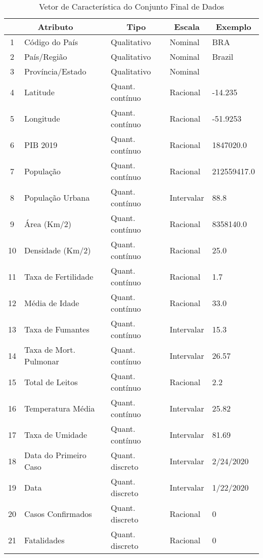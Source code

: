 \documentclass{ieeeaccess}
\begin{document}
\begin{table}[t!]
	\caption{Vetor de Característica do Conjunto Final de Dados}
	\label{tab1}
	\setlength{\tabcolsep}{3pt}
	\setlength\extrarowheight{2.5pt}
	
	\centering	
	\begin{tabular}{| c | l | l | l | l |}
		\hline
		\multicolumn{2}{|c|}{Atributo} & \multicolumn{1}{c|}{Tipo} & \multicolumn{1}{c|}{Escala} & \multicolumn{1}{c|}{Exemplo} \\ \hline
		
		1  & Código do País & Qualitativo & Nominal & BRA \\
		2 & País/Região & Qualitativo & Nominal & Brazil \\
		3 & Província/Estado & Qualitativo & Nominal & \\
		4 & Latitude & Quant. contínuo & Racional & -14.235 \\
		5 & Longitude & Quant. contínuo & Racional & -51.9253 \\
		6 & PIB 2019 & Quant. contínuo & Racional & 1847020.0 \\
		7 & População & Quant. contínuo & Racional & 212559417.0 \\
		8 & População Urbana & Quant. contínuo & Intervalar & 88.8 \\
		9 & Área (Km/2) & Quant. contínuo & Racional & 8358140.0 \\
		10 & Densidade (Km/2) & Quant. contínuo & Racional & 25.0  \\
		11 & Taxa de Fertilidade & Quant. contínuo & Racional & 1.7 \\
		12 & Média de Idade & Quant. contínuo & Racional & 33.0  \\
		13 & Taxa de Fumantes & Quant. contínuo & Intervalar & 15.3 \\
		14 & Taxa de Mort. Pulmonar & Quant. contínuo & Intervalar & 26.57 \\
		15 & Total de Leitos & Quant. contínuo & Racional & 2.2 \\
		16 & Temperatura Média & Quant. contínuo & Intervalar & 25.82 \\
		17 & Taxa de Umidade & Quant. contínuo & Intervalar & 81.69 \\
		18 & Data do Primeiro Caso & Quant. discreto & Intervalar & 2/24/2020 \\
		19 & Data & Quant. discreto & Intervalar & 1/22/2020 \\
		20 & Casos Confirmados & Quant. discreto & Racional & 0 \\ 
		21 & Fatalidades & Quant. discreto & Racional & 0 \\ \hline
		

\end{tabular}
\end{table}
\end{document}
